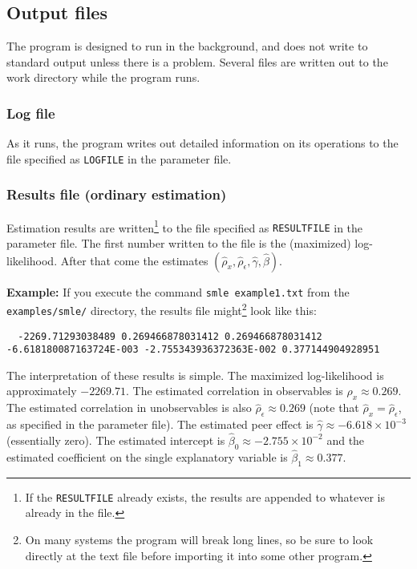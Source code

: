 \documentclass{article}
\begin{document}
\subsection{Output files}\label{sec:output_smle}

The program is designed to run in the background, and does not write to standard output unless there is 
a problem.  Several files are written out to the work directory while the program runs.


\subsubsection{Log file}

As it runs, the program writes out detailed information on its operations to the file specified as 
{\tt LOGFILE} in the parameter file.  

\subsubsection{Results file (ordinary estimation)}

Estimation results are written\footnote{If the {\tt RESULTFILE} already exists, 
the results are appended to whatever is already in the file.}
to the file specified as {\tt RESULTFILE} in the parameter file.
The first number written to the file is the (maximized) log-likelihood.  After that come 
the estimates $(\hat{\rho}_x,\hat{\rho}_{\epsilon},\hat{\gamma},\hat{\beta})$.

{\bf Example:} If you execute the command {\tt smle example1.txt}
from the {\tt examples/smle/} directory, the results file 
might\footnote{On many systems the program will break long lines, 
so be sure to look directly at the text file before importing it 
into some other program.} look like this:
{\scriptsize
\begin{verbatim}
  -2269.71293038489 0.269466878031412 0.269466878031412 -6.618180087163724E-003 -2.755343936372363E-002 0.377144904928951     
\end{verbatim}}
The interpretation of these results is simple.  The maximized log-likelihood 
is approximately $-2269.71$.  The estimated correlation in observables 
is $\hat{\rho}_x \approx 0.269$.  The estimated correlation in unobservables
is also $\hat{\rho}_{\epsilon} \approx 0.269$ (note that $\hat{\rho}_x=\hat{\rho}_{\epsilon}$, 
as specified in the parameter file).  The estimated peer effect is 
$\hat{\gamma} \approx -6.618 \times 10^{-3}$ (essentially zero).  The estimated intercept
is $\hat{\beta}_0 \approx -2.755 \times 10^{-2}$ and the estimated coefficient on the
single explanatory variable is $\hat{\beta}_1 \approx  0.377$.
\end{document}
